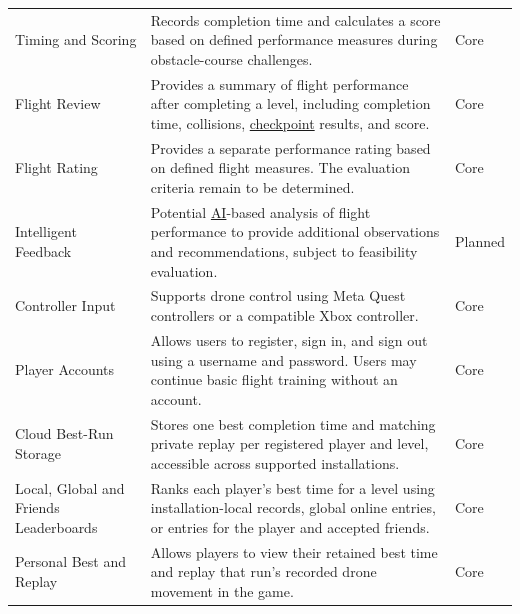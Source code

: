 \documentclass[12pt]{article}
\begin{document}
\begin{longtable}{
    @{}p{4.0cm} p{\dimexpr\textwidth-6.4cm-4\tabcolsep\relax} p{2.4cm}@{}
}
\addlinespace

Timing and Scoring &
Records completion time and calculates a score
based on defined performance measures during
obstacle-course challenges. &
Core \\

\addlinespace

Flight Review &
Provides a summary of flight performance after
completing a level, including completion time,
collisions, \hyperlink{glos:Checkpoint}{checkpoint} results, and score. &
Core \\

\addlinespace

Flight Rating &
Provides a separate performance rating based on
defined flight measures. The evaluation criteria
remain to be determined. &
Core \\

\addlinespace

Intelligent Feedback &
Potential \hypertarget{gl:AI}{}\hyperlink{glos:AI}{AI}-based analysis of flight performance
to provide additional observations and recommendations,
subject to feasibility evaluation. &
Planned \\

\addlinespace

Controller Input &
Supports drone control using Meta Quest controllers
or a compatible Xbox controller. &
Core \\

\addlinespace

Player Accounts &
Allows users to register, sign in, and sign out
using a username and password. Users may continue
basic flight training without an account. &
Core \\

\addlinespace

Cloud Best-Run Storage &
Stores one best completion time and matching private replay per registered
player and level, accessible across supported installations. &
Core \\

\addlinespace

Local, Global and Friends Leaderboards &
Ranks each player's best time for a level using installation-local records,
global online entries, or entries for the player and accepted friends. &
Core \\

\addlinespace

Personal Best and Replay &
Allows players to view their retained best time and replay that run's recorded
drone movement in the game. &
Core \\


\bottomrule
\end{longtable}
\endgroup
\end{document}
